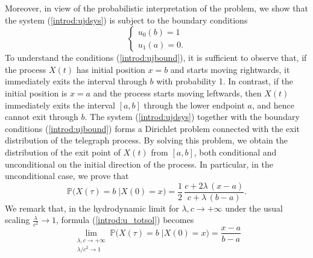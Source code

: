 \documentclass{article}
\begin{document}
Moreover, in view of the probabilistic interpretation of the problem, we show that the system (\ref{introd:ujdsys}) is subject to the boundary conditions
\begin{equation}\label{introd:ujbound}\begin{cases}u_0(b)=1\\u_1(a)=0.\end{cases}\end{equation}
To understand the conditions (\ref{introd:ujbound}), it is sufficient to observe that, if the process $X(t)$ has initial position $x=b$ and starts moving rightwards, it immediately exits the interval through $b$ with probability 1. In contrast, if the initial position is $x=a$ and the process starts moving leftwards, then $X(t)$ immediately exits the interval $[a,b]$ through the lower endpoint $a$, and hence cannot exit through $b$. The system (\ref{introd:ujdsys}) together with the boundary conditions (\ref{introd:ujbound}) forms a Dirichlet problem connected with the exit distribution of the telegraph process. By solving this problem, we obtain the distribution of the exit point of $X(t)$ from $[a,b]$, both conditional and unconditional on the initial direction of the process. In particular, in the unconditional case, we prove that 
\begin{equation}\mathbb{P}\Big(X(\tau)=b\;\Big\lvert X(0)=x\Big)=\frac{1}{2}\,\frac{c+2\lambda\,(x-a)}{c+\lambda\,(b-a)}.\label{introd:u_totsol}\end{equation}
We remark that, in the hydrodynamic limit for $\lambda,c\to+\infty$ under the usual scaling $\frac{\lambda}{c^2}\to1$, formula (\ref{introd:u_totsol}) becomes
\begin{equation}\lim_{\substack{\lambda,c\to+\infty\\\lambda/c^2\to1}}\mathbb{P}\Big(X(\tau)=b\;\Big\lvert X(0)=x\Big)=\frac{x-a}{b-a}\label{introd:u_totsollim}\end{equation}
\end{document}
